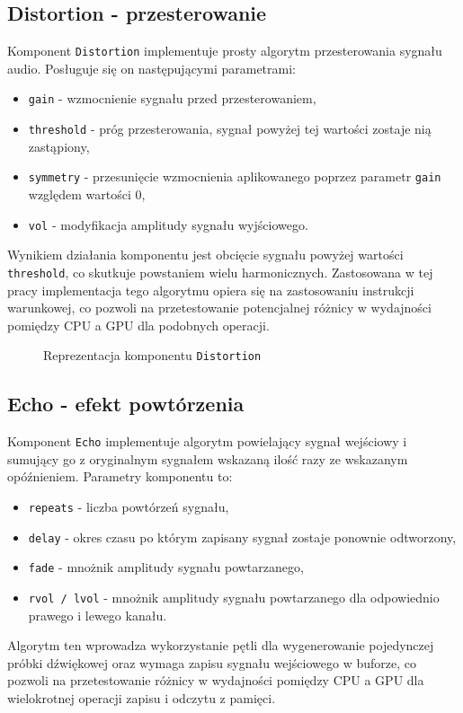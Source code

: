 \subsection{Distortion - przesterowanie}
Komponent \texttt{Distortion} implementuje prosty algorytm przesterowania sygnału audio. Posługuje się on następującymi parametrami:
\begin{itemize}
    \item \texttt{gain} - wzmocnienie sygnału przed przesterowaniem,
    \item \texttt{threshold} - próg przesterowania, sygnał powyżej tej wartości zostaje nią zastąpiony,
    \item \texttt{symmetry} - przesunięcie wzmocnienia aplikowanego poprzez parametr \texttt{gain} względem wartości 0,
    \item \texttt{vol} - modyfikacja amplitudy sygnału wyjściowego.
\end{itemize}
Wynikiem działania komponentu jest obcięcie sygnału powyżej wartości \texttt{threshold}, co skutkuje powstaniem wielu harmonicznych.
Zastosowana w tej pracy implementacja tego algorytmu opiera się na zastosowaniu instrukcji warunkowej, co pozwoli na przetestowanie potencjalnej różnicy w wydajności pomiędzy CPU a GPU dla podobnych operacji. 

\begin{figure}[H]
    \centering
    
    \caption{Reprezentacja komponentu \texttt{Distortion}}
    \label{fig:Reprezentacja komponentu Distortion}
\end{figure}

\subsection{Echo - efekt powtórzenia}
Komponent \texttt{Echo} implementuje algorytm powielający sygnał wejściowy i sumujący go z oryginalnym sygnałem wskazaną ilość razy ze wskazanym opóźnieniem. Parametry komponentu to:
\begin{itemize}
    \item \texttt{repeats} - liczba powtórzeń sygnału,
    \item \texttt{delay} - okres czasu po którym zapisany sygnał zostaje ponownie odtworzony,
    \item \texttt{fade} - mnożnik amplitudy sygnału powtarzanego,
    \item \texttt{rvol / lvol} - mnożnik amplitudy sygnału powtarzanego dla odpowiednio prawego i lewego kanału.
\end{itemize}
Algorytm ten wprowadza wykorzystanie pętli dla wygenerowanie pojedynczej próbki dźwiękowej oraz wymaga zapisu sygnału wejściowego w buforze, co pozwoli na przetestowanie różnicy w wydajności pomiędzy CPU a GPU dla wielokrotnej operacji zapisu i odczytu z pamięci.


